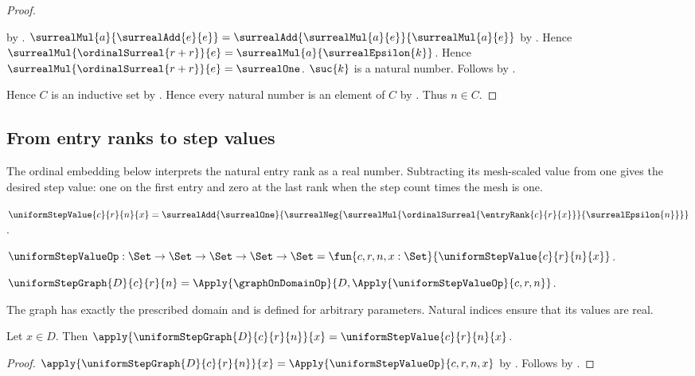 \begin{proof}
\begin{subproof}
            by .
        $\surrealMul{a}{\surrealAdd{e}{e}}
            =\surrealAdd{\surrealMul{a}{e}}{\surrealMul{a}{e}}$
            by .
        Hence $\surrealMul{\ordinalSurreal{r+r}}{e}
            =\surrealMul{a}{\surrealEpsilon{k}}$.
        Hence $\surrealMul{\ordinalSurreal{r+r}}{e}=\surrealOne$.
        $\suc{k}$ is a natural number.
        Follows by \auto.
    \end{subproof}
    Hence $C$ is an inductive set by .
    Hence every natural number is an element of $C$
        by .
    Thus $n\in C$.
\end{proof}

\subsection{From entry ranks to step values}

The ordinal embedding below interprets the natural entry rank as a real
number. Subtracting its mesh-scaled value from one gives the desired step
value: one on the first entry and zero at the last rank when the step count
times the mesh is one.

\begin{definition}\label{uniform_step_value}
    $\uniformStepValue{c}{r}{n}{x}
        =\surrealAdd{\surrealOne}{
            \surrealNeg{
                \surrealMul{
                    \ordinalSurreal{\entryRank{c}{r}{x}}}
                    {\surrealEpsilon{n}}}}$.
\end{definition}

\begin{definition}\label{uniform_step_value_op}
    $\uniformStepValueOp:\Set\to\Set\to\Set\to\Set\to\Set
        =\fun{c,r,n,x:\Set}{
            \uniformStepValue{c}{r}{n}{x}}$.
\end{definition}

\begin{definition}\label{uniform_step_graph}
    $\uniformStepGraph{D}{c}{r}{n}
        =\Apply{\graphOnDomainOp}
            {D,\Apply{\uniformStepValueOp}{c,r,n}}$.
\end{definition}

The graph has exactly the prescribed domain and is defined for arbitrary
parameters. Natural indices ensure that its values are real.

\begin{proposition}\label{uniform_step_graph_apply}
    Let $x\in D$.
    Then $\apply{\uniformStepGraph{D}{c}{r}{n}}{x}
        =\uniformStepValue{c}{r}{n}{x}$.
\end{proposition}
\begin{proof}
    $\apply{\uniformStepGraph{D}{c}{r}{n}}{x}
        =\Apply{\uniformStepValueOp}{c,r,n,x}$
        by .
    Follows by .
\end{proof}

